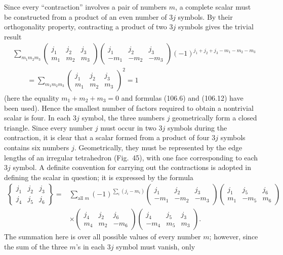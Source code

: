 Since every ``contraction'' involves a pair of numbers $m$, a complete scalar must be constructed from a product of an even number of $3j$ symbols. By their orthogonality property, contracting a product of two $3j$ symbols gives the trivial result
\[
\begin{aligned}
&\sum_{m_1m_2m_3}
\begin{pmatrix}j_1&j_2&j_3\\m_1&m_2&m_3\end{pmatrix}
\begin{pmatrix}j_1&j_2&j_3\\-m_1&-m_2&-m_3\end{pmatrix}
(-1)^{j_1+j_2+j_3-m_1-m_2-m_3}\\
&\qquad=\sum_{m_1m_2m_3}
\begin{pmatrix}j_1&j_2&j_3\\m_1&m_2&m_3\end{pmatrix}^{2}=1
\end{aligned}
\]
(here the equality $m_1+m_2+m_3=0$ and formulas (106.6) and (106.12) have been used). Hence the smallest number of factors required to obtain a nontrivial scalar is four. In each $3j$ symbol, the three numbers $j$ geometrically form a closed triangle. Since every number $j$ must occur in two $3j$ symbols during the contraction, it is clear that a scalar formed from a product of four $3j$ symbols contains six numbers $j$. Geometrically, they must be represented by the edge lengths of an irregular tetrahedron (Fig.~45), with one face corresponding to each $3j$ symbol. A definite convention for carrying out the contractions is adopted in defining the scalar in question; it is expressed by the formula
\begin{equation}
\begin{aligned}
\left\{\begin{matrix}j_1&j_2&j_3\\j_4&j_5&j_6\end{matrix}\right\}
={}&\sum_{\text{all }m}(-1)^{\sum_i(j_i-m_i)}
\begin{pmatrix}j_1&j_2&j_3\\-m_1&-m_2&-m_3\end{pmatrix}
\begin{pmatrix}j_1&j_5&j_6\\m_1&-m_5&m_6\end{pmatrix}\\
&\times\begin{pmatrix}j_4&j_2&j_6\\m_4&m_2&-m_6\end{pmatrix}
\begin{pmatrix}j_4&j_5&j_3\\-m_4&m_5&m_3\end{pmatrix}.
\end{aligned}
\tag{108.2}
\end{equation}
The summation here is over all possible values of every number $m$; however, since the sum of the three $m$'s in each $3j$ symbol must vanish, only

